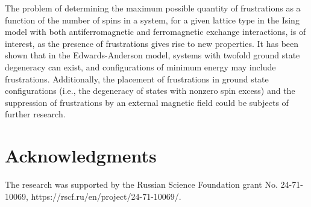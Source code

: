 \documentclass[preprint,12pt]{elsarticle}
\begin{document}
	The problem of determining the maximum possible quantity of frustrations as a function of the number of spins in a system, for a given lattice type in the Ising model with both antiferromagnetic and ferromagnetic exchange interactions, is of interest, as the presence of frustrations gives rise to new properties.
	It has been shown that in the Edwards-Anderson model, systems with twofold ground state degeneracy can exist, and configurations of minimum energy may include frustrations. Additionally, the placement of frustrations in ground state configurations (i.e., the degeneracy of states with nonzero spin excess) and the suppression of frustrations by an external magnetic field could be subjects of further research.
	
	
	\section{Acknowledgments}
	
	The research was supported by the Russian Science Foundation grant No. 24-71-10069, https://rscf.ru/en/project/24-71-10069/.
	
	
	
	
\end{document}
